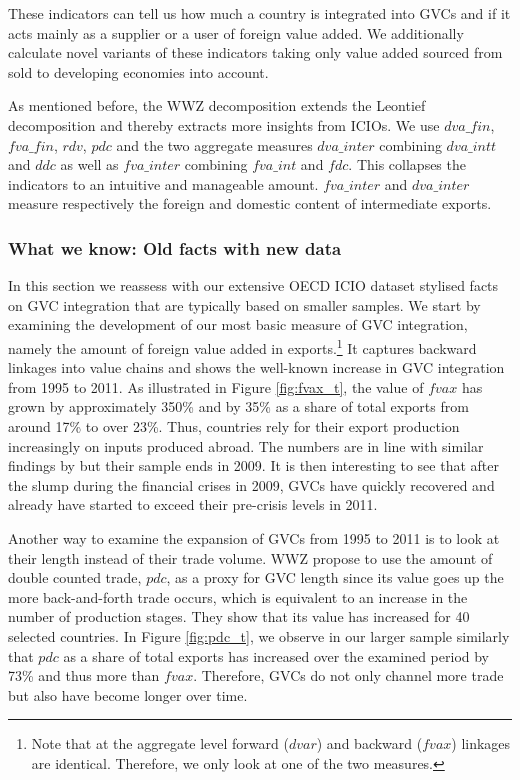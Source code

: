 \documentclass[a4paper,11pt]{article}
\begin{document}
These indicators can tell us how much a country is integrated into GVCs and if it acts mainly as a supplier or a user of foreign value added. We additionally calculate novel variants of these indicators taking only value added sourced from sold to developing economies into account. 

As mentioned before, the WWZ decomposition extends the Leontief decomposition and thereby extracts more insights from ICIOs. We use $dva\_fin$, $fva\_fin$, $rdv$, $pdc$ and the two aggregate measures $dva\_inter$ combining $dva\_intt$ and $ddc$ as well as $fva\_inter$ combining $fva\_int$ and $fdc$. This collapses the indicators to an intuitive and manageable amount. $fva\_inter$ and $dva\_inter$ measure respectively the foreign and domestic content of intermediate exports.

\subsubsection{What we know: Old facts with new data}\label{sec:basics}

In this section we reassess with our extensive OECD ICIO dataset stylised facts on GVC integration that are typically based on smaller samples. We start by examining the development of our most basic measure of GVC integration, namely the amount of foreign value added in exports.\footnote{Note that at the aggregate level forward ($dvar$) and backward ($fvax$) linkages are identical. Therefore, we only look at one of the two measures.} It captures backward linkages into value chains and shows the well-known increase in GVC integration from 1995 to 2011. As illustrated in Figure \ref{fig:fvax_t}, the value of $fvax$ has grown by approximately 350\% and by 35\% as a share of total exports from around 17\% to over 23\%. Thus, countries rely for their export production increasingly on inputs produced abroad. The numbers are in line with similar findings by \citet{rojoguno12a} but their sample ends in 2009. It is then interesting to see that after the slump during the financial crises in 2009, GVCs have quickly recovered and already have started to exceed their pre-crisis levels in 2011.

Another way to examine the expansion of GVCs from 1995 to 2011 is to look at their length instead of their trade volume. WWZ propose to use the amount of double counted trade, $pdc$, as a proxy for GVC length since its value goes up the more back-and-forth trade occurs, which is equivalent to an increase in the number of production stages. They show that its value has increased for 40 selected countries. In Figure \ref{fig:pdc_t}, we observe in our larger sample similarly that $pdc$ as a share of total exports has increased over the examined period by 73\% and thus more than $fvax$. Therefore, GVCs do not only channel more trade but also have become longer over time.
\end{document}
